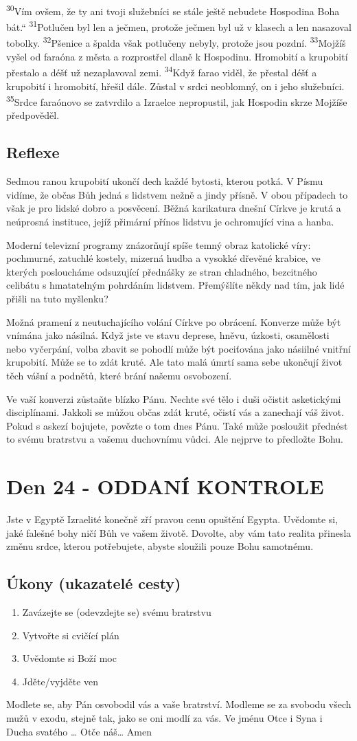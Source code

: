 \documentclass[11pt]{article}
\newcommand{\zacatekCtvrtyTyden}{
  Jste v Egyptě \newline
  Izraelité konečně zří pravou cenu opuštění Egypta. Uvědomte si, jaké falešné bohy ničí Bůh ve vašem životě.
Dovolte, aby vám tato realita přinesla změnu srdce, kterou potřebujete, abyste sloužili pouze Bohu samotnému.

\subsection*{Úkony (ukazatelé cesty)}
\begin{enumerate}
  \item Zavázejte se (odevzdejte se) svému bratrstvu
  \item Vytvořte si cvičící plán
  \item Uvědomte si Boží moc
  \item Jděte/vyjděte ven
\end{enumerate}
Modlete se, aby Pán osvobodil vás a vaše bratrství. \newline
Modleme se za svobodu všech mužů v exodu, stejně tak, jako se oni modlí za vás.\newline
Ve jménu Otce i Syna i Ducha svatého …  Otče náš… Amen
}
\begin{document}
{\textsuperscript{30}Vím ovšem, že ty ani tvoji služebníci se stále ještě nebudete Hospodina Boha bát.“
\textsuperscript{31}Potlučen byl len a ječmen, protože ječmen byl už v klasech a len nasazoval tobolky.
\textsuperscript{32}Pšenice a špalda však potlučeny nebyly, protože jsou pozdní.
\textsuperscript{33}Mojžíš vyšel od faraóna z města a rozprostřel dlaně k Hospodinu. Hromobití a krupobití přestalo a déšť už nezaplavoval zemi.
\textsuperscript{34}Když farao viděl, že přestal déšť a krupobití i hromobití, hřešil dále. Zůstal v srdci neoblomný, on i jeho služebníci.
\textsuperscript{35}Srdce faraónovo se zatvrdilo a Izraelce nepropustil, jak Hospodin skrze Mojžíše předpověděl.
}

\subsection*{Reflexe}
Sedmou ranou krupobití ukončí dech každé bytosti, kterou potká. V Písmu vidíme, že občas Bůh jedná s lidstvem nežně a
jindy přísně. V obou případech to však je pro lidské dobro a posvěcení.
Běžná karikatura dnešní Církve je krutá a neúprosná instituce, jejíž přimární přínos lidstvu je ochromující vina a hanba.

Moderní televizní programy znázorňují spíše temný obraz katolické víry: pochmurné, zatuchlé kostely, mizerná hudba a
vysokké dřevěné krabice, ve kterých posloucháme odsuzující přednášky ze stran chladného, bezcitného celibátu s hmatatelným
pohrdáním lidstvem. Přemýšlíte někdy nad tím, jak lidé přišli na tuto myšlenku?

Možná pramení z neutuchajícího volání Církve po obrácení. Konverze může být vnímána jako násilná. Když jste ve stavu
deprese, hněvu, úzkosti, osamělosti nebo vyčerpání, volba zbavit se pohodlí může být pociťována jako násiilné vnitřní
krupobití. Může se to zdát kruté. Ale tato malá úmrtí sama sebe ukončují život těch vášní a podnětů, které brání našemu
osvobození.

Ve vaší konverzi zůstaňte blízko Pánu. Nechte své tělo i duši očistit asketickými disciplínami. Jakkoli se můžou občas zdát
kruté, očistí vás a zanechají váš život. Pokud s askezí bojujete, povězte o tom dnes Pánu. Také může posloužit přednést to
svému bratrstvu a vašemu duchovnímu vůdci. Ale nejprve to předložte Bohu.

\newpage
\section{Den 24 - ODDANÍ KONTROLE}
\zacatekCtvrtyTyden
\end{document}
